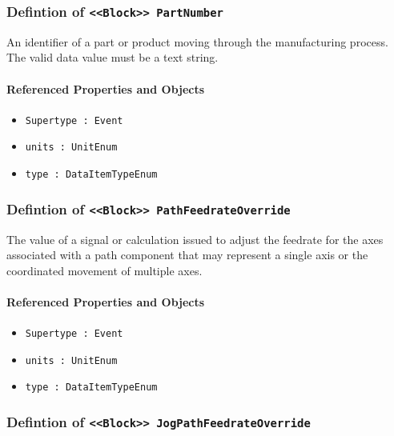 \subsubsection{Defintion of \texttt{<<Block>> PartNumber}}
  \label{type:PartNumber}

\FloatBarrier

An identifier of a part or product moving through the manufacturing process. 
 The valid data value must be a text string. 

\FloatBarrier
\paragraph{Referenced Properties and Objects}

\begin{itemize}
\item \texttt{Supertype : Event}

\item \texttt{units : UnitEnum}

\item \texttt{type : DataItemTypeEnum}

\end{itemize}
\FloatBarrier
\subsubsection{Defintion of \texttt{<<Block>> PathFeedrateOverride}}
  \label{type:PathFeedrateOverride}

\FloatBarrier

The value of a signal or calculation issued to adjust the feedrate for the axes associated with a path component that may represent a single axis or the coordinated movement of multiple axes.

\FloatBarrier
\paragraph{Referenced Properties and Objects}

\begin{itemize}
\item \texttt{Supertype : Event}

\item \texttt{units : UnitEnum}

\item \texttt{type : DataItemTypeEnum}

\end{itemize}
\FloatBarrier
\subsubsection{Defintion of \texttt{<<Block>> JogPathFeedrateOverride}}
  \label{type:JogPathFeedrateOverride}

